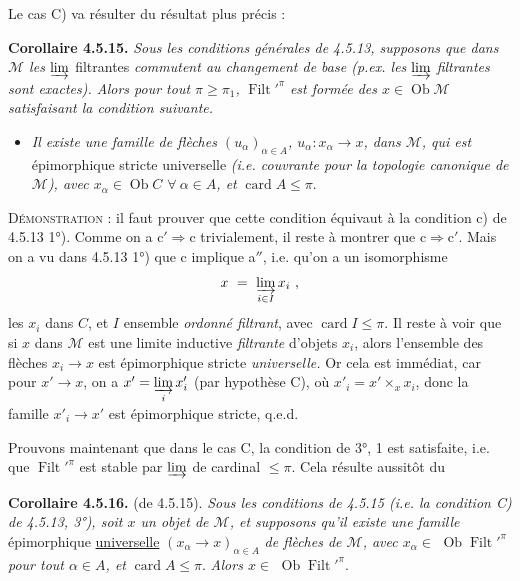 \documentclass[11pt]{article}
\newcommand{\printedpage}[1]{\marginpar{\footnotesize p.~#1}}
\newcommand{\msp}[1]{\marginpar{\footnotesize [#1]}}
\newcommand{\Filt}{\operatorname{Filt}}
\newcommand{\card}{\operatorname{card}}
\newcommand{\Ob}{\operatorname{Ob}}
\begin{document}
Le cas C) va résulter du résultat plus précis :

\textbf{Corollaire 4.5.15.} \textit{Sous les conditions générales de 4.5.13, supposons que dans $\mathcal{M}$ les} $\varinjlim$
\msp{page 136}
filtrantes \textit{commutent au changement de base (p.ex. les} $\varinjlim$ \textit{filtrantes sont exactes). Alors pour tout $\pi \geqslant \pi_1$,} $\Filt'^{\pi}$ \textit{est formée des $x \in \Ob \mathcal{M}$ satisfaisant la condition suivante.}

\printedpage{43}
\begin{itemize}
\item[\textit{c$'$)}] \textit{Il existe une famille de flèches $(u_{\alpha})_{\alpha\in A}$, $u_{\alpha} : x_{\alpha} \longrightarrow x$, dans $\mathcal{M}$, qui est} épimorphique stricte universelle \textit{(i.e. couvrante pour la topologie canonique de $\mathcal{M}$), avec $x_{\alpha} \in \Ob C$ $\forall\ \alpha \in A$, et} $\card A \leqslant \pi$.
\end{itemize}
\textsc{Démonstration} : il faut prouver que cette condition équivaut à la condition c) de 4.5.13 1°). Comme on a $\mathrm{c}' \Longrightarrow \mathrm{c}$ trivialement, il reste à montrer que $\mathrm{c} \Longrightarrow \mathrm{c}'$. Mais on a vu dans 4.5.13 1°) que c implique a$''$, i.e. qu'on a un isomorphisme
\[ x \ = \ \varinjlim_{i\in I} x_i \ , \]
les $x_i$ dans $C$, et $I$ ensemble \textit{ordonné filtrant}, avec $\card I \leqslant \pi$. Il reste à voir que si $x$ dans $\mathcal{M}$ est une limite inductive \textit{filtrante} d'objets $x_i$, alors l'ensemble des flèches $x_i \longrightarrow x$ est épimorphique stricte \textit{universelle.} Or cela est immédiat, car pour $x' \longrightarrow x$, on a $x' = \varinjlim\limits_{i} x'_i$ (par hypothèse C), où $x'_i = x' \times_x x_i$, donc la famille $x'_i \longrightarrow x'$ est épimorphique stricte, q.e.d.

Prouvons maintenant que dans le cas C, la condition de 3°, 1 est satisfaite, i.e. que $\Filt'^{\pi}$ est stable par $\varinjlim$ de cardinal $\leqslant \pi$. Cela
\msp{page 137}
résulte aussitôt du

\textbf{Corollaire 4.5.16.} (de 4.5.15). \textit{Sous les conditions de 4.5.15 (i.e. la condition C) de 4.5.13, 3°), soit $x$ un objet de $\mathcal{M}$, et supposons qu'il existe une famille} épimorphique \underline{universelle} $(x_{\alpha} \longrightarrow x)_{\alpha\in A}$ \textit{de flèches de $\mathcal{M}$, avec $x_{\alpha} \in$} $\Ob \Filt'^{\pi}$ \textit{pour tout $\alpha \in A$, et} $\card A \leqslant \pi$. \textit{Alors $x \in$} $\Ob \Filt'^{\pi}$.
\end{document}
